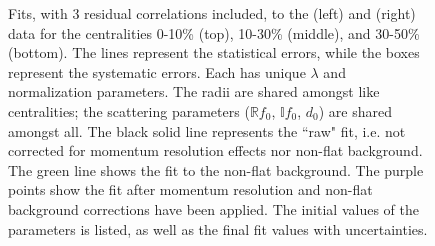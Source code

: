 \documentclass[../AnalysisNoteJBuxton.tex]{subfiles}
\renewcommand{\ResNum}{_3Res}
\renewcommand{\SaveNameModLamKch}{\MomRes\NonFlatBgd\ResNum\PrimMaxDecay\ResMethod\ParamFixAndShareLamKch}
\begin{document}
\begin{landscape}
\begin{figure}[h!]
  \centering
  \caption[\LamKchPALamKchM Fits with 3 Residuals]{Fits, with 3 residual correlations included, to the \LamKchP (left) and \ALamKchM (right) data for the centralities 0-10\% (top), 10-30\% (middle), and 30-50\% (bottom).
The lines represent the statistical errors, while the boxes represent the systematic errors.  
Each has unique $\lambda$ and normalization parameters.
The radii are shared amongst like centralities; the scattering parameters ($\mathbb{R}f_{0}$, $\mathbb{I}f_{0}$, $d_{0}$) are shared amongst all.
The black solid line represents the ``raw" fit, i.e. not corrected for momentum resolution effects nor non-flat background.  
The green line shows the fit to the non-flat background.
The purple points show the fit after momentum resolution and non-flat background corrections have been applied.
The initial values of the parameters is listed, as well as the final fit values with uncertainties.}
  \label{fig:LamKchPwConjFits_3Res}
\end{figure}



\end{landscape}
\end{document}
